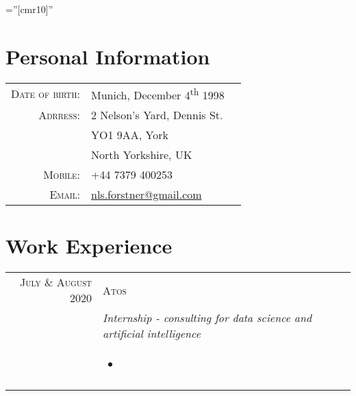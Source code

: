 \documentclass[a4paper,10pt]{article}
\begin{document}
\pagestyle{empty} %

\font\fb=''[cmr10]'' %

\par{
    \bigskip\par
}


\section{Personal Information}

\begin{tabular}{rll}
    \textsc{Date of birth:} & Munich, December 4\textsuperscript{th} 1998 \\
    \textsc{Adrress:}       & 2 Nelson's Yard, Dennis St. \\
    \textsc{}               & YO1 9AA, York \\
    \textsc{}               & North Yorkshire, UK \\
    \textsc{Mobile:}        & +44 7379 400253\\
    \textsc{Email:}         & \href{mailto:nls.forstner@gmail.com}{nls.forstner@gmail.com} \\

\end{tabular}

\section{Work Experience}
\begin{tabular}{r|p{11cm}}

\textsc{July \& August 2020}& \textsc{Atos} \\\textsc{}&\emph{Internship -
    consulting for data science and artificial intelligence}\\&\footnotesize{
    \vspace{-2mm}
    \begin{itemize}[leftmargin=*]
        \item
    \end{itemize}
    \vspace{-5mm}
}\\\multicolumn{2}{c}{}\\
\end{tabular}
\end{document}
